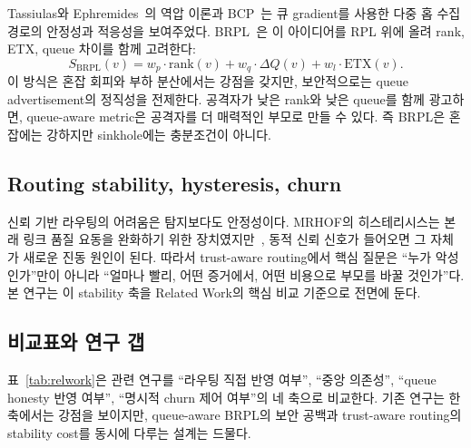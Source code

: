 \documentclass[10pt,a4paper,twocolumn]{article}
\begin{document}
Tassiulas와 Ephremides~\cite{tassiulas1992}의 역압 이론과
BCP~\cite{bcp2010}는 큐 gradient를 사용한 다중 홉 수집 경로의
안정성과 적응성을 보여주었다.
BRPL~\cite{brpl}은 이 아이디어를 RPL 위에 올려
rank, ETX, queue 차이를 함께 고려한다:
\begin{equation}
  S_{\text{BRPL}}(v) = w_p\!\cdot\!\text{rank}(v)
                     + w_q\!\cdot\!\Delta Q(v)
                     + w_l\!\cdot\!\text{ETX}(v).
  \label{eq:brpl}
\end{equation}
이 방식은 혼잡 회피와 부하 분산에서는 강점을 갖지만,
보안적으로는 queue advertisement의 정직성을 전제한다.
공격자가 낮은 rank와 낮은 queue를 함께 광고하면,
queue-aware metric은 공격자를 더 매력적인 부모로 만들 수 있다.
즉 BRPL은 혼잡에는 강하지만 sinkhole에는 충분조건이 아니다.

\subsection{Routing stability, hysteresis, churn}

신뢰 기반 라우팅의 어려움은 탐지보다도 안정성이다.
MRHOF의 히스테리시스는 본래 링크 품질 요동을 완화하기 위한 장치였지만~\cite{rfc6719},
동적 신뢰 신호가 들어오면 그 자체가 새로운 진동 원인이 된다.
따라서 trust-aware routing에서 핵심 질문은
``누가 악성인가''만이 아니라 ``얼마나 빨리, 어떤 증거에서, 어떤 비용으로
부모를 바꿀 것인가''다.
본 연구는 이 stability 축을
Related Work의 핵심 비교 기준으로 전면에 둔다.

\subsection{비교표와 연구 갭}

표~\ref{tab:relwork}은 관련 연구를
``라우팅 직접 반영 여부'', ``중앙 의존성'', ``queue honesty 반영 여부'',
``명시적 churn 제어 여부''의 네 축으로 비교한다.
기존 연구는 한 축에서는 강점을 보이지만,
queue-aware BRPL의 보안 공백과
trust-aware routing의 stability cost를 동시에 다루는 설계는 드물다.
\end{document}
